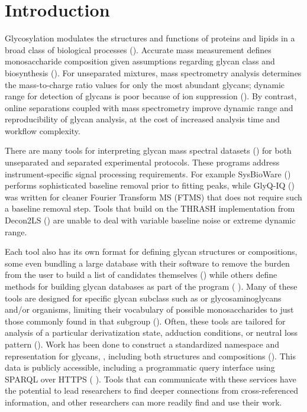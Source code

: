 \section{Introduction}

Glycosylation modulates the structures and functions of proteins and lipids
in a broad class of biological processes (\citealp{Varki2017}). Accurate mass
measurement defines monosaccharide composition given assumptions regarding
glycan class and biosynthesis (\citealp{Zaia2008}). For unseparated mixtures,
mass spectrometry analysis determines the mass-to-charge ratio values for
only the most abundant glycans; dynamic range for detection of glycans is
poor because of ion suppression (\citealp{Peltoniemi2013}). By contrast, online
separations coupled with mass spectrometry improve dynamic range and
reproducibility of glycan analysis, at the cost of increased analysis time
and workflow complexity.

There are many tools for interpreting glycan mass spectral datasets
(\citealp{Yu2013,Peltoniemi2013,Kronewitter2014,Goldberg2009,Maxwell2012,Ceroni2008,Frank2010})
for both unseparated and separated experimental protocols. These programs address
instrument-specific signal processing requirements. For example SysBioWare
(\citealp{Frank2010}) performs sophisticated baseline removal prior to fitting
peaks, while GlyQ-IQ (\citealp{Kronewitter2014}) was written for cleaner Fourier Transform
MS (FTMS) that does not require such a baseline removal step. Tools that build on
the THRASH implementation from Decon2LS (\citealp{Jaitly2009,Yu2013,Maxwell2012})
are unable to deal with variable baseline noise or extreme dynamic range.

Each tool also has its own format for defining glycan structures or compositions,
some even bundling a large database with their software to remove the burden from
the user to build a list of candidates themselves (\citealp{Yu2013,Kronewitter2014,Goldberg2009})
while others define methods for building glycan databases as part of the program (
\citealp{Maxwell2012,Ceroni2008}). Many of these tools are designed for specific glycan
subclass such as \nglycans or glycosaminoglycans and/or organisms, limiting their
vocabulary of possible monosaccharides to just those commonly found in that subgroup
(\citealp{Yu2013,Kronewitter2014,Peltoniemi2013,Goldberg2009}). Often, these tools are
tailored for analysis of a particular derivatization state, adduction conditions, or
neutral loss pattern (\citealp{Yu2013,Peltoniemi2013,Maxwell2012}). Work has been done
to construct a standardized namespace and representation for glycans, \glyspace, including both
structures and compositions (\citealp{Tiemeyer2017,Campbell2014}). This data is publicly
accessible, including a programmatic query interface using SPARQL over HTTPS (
\citealp{Aoki-Kinoshita2015}). Tools that can communicate with these services have the
potential to lead researchers to find deeper connections from cross-referenced information,
and other researchers can more readily find and use their work.

